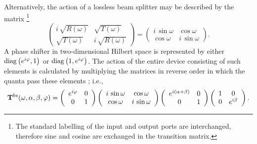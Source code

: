 \documentclass[pra,showpacs,showkeys,amsfonts]{revtex4}
\begin{document}
Alternatively, the action of a lossless beam splitter may be
described by the matrix
\footnote{
The standard labelling of the input and output ports are interchanged,
therefore sine and cosine are exchanged in the transition matrix.}
$$
\left(
\begin{array}{cc}
i \, \sqrt{R(\omega )}& \sqrt{T(\omega )}
\\
\sqrt{T(\omega )}&  i\, \sqrt{R(\omega )}
 \end{array}
\right)
=
\left(
\begin{array}{cc}
i \, \sin \omega  & \cos \omega
\\
\cos \omega&  i\, \sin \omega
 \end{array}
\right)
.
$$
A phase shifter in two-dimensional Hilbert space is represented by
either
${\rm  diag}\left(
e^{i\varphi },1
\right)
$
or
${\rm  diag}
\left(
1,e^{i\varphi }
\right)
$.
 The action of the entire device consisting of such elements is
calculated by multiplying the matrices in reverse order in which the
quanta pass these elements \cite{yurke-86,teich:90}; i.e.,
\begin{equation}
{\bf T}^{bs} (\omega ,\alpha ,\beta ,\varphi )=
\left(
\begin{array}{cc}
e^{i\varphi}& 0\\
0& 1
\end{array}
\right)
\left(
\begin{array}{cc}
i \, \sin \omega  & \cos \omega
\\
\cos \omega&  i\, \sin \omega
\end{array}
\right)
\left(
\begin{array}{cc}
e^{i(\alpha + \beta)}& 0\\
0& 1
\end{array}
\right)
\left(
\begin{array}{cc}
1&0\\
0& e^{i\beta }
\end{array}
\right).
\end{equation}
\end{document}
